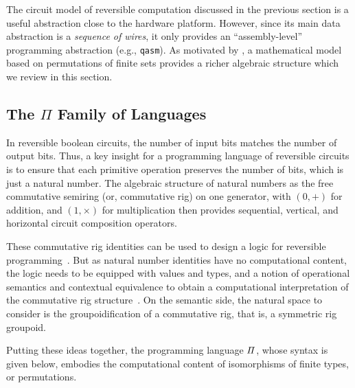 The circuit model of reversible computation discussed in the previous section is a useful abstraction close to the hardware
platform. However, since its main data abstraction is a \emph{sequence of wires}, it only provides an ``assembly-level''
programming abstraction (e.g., \verb|qasm|). As motivated by \citet{LAFONT2003257}, a mathematical model based on
permutations of finite sets provides a richer algebraic structure which we review in this section.

\subsection{The $\Pi$ Family of Languages}
\label{sec:langRev-examples}
\label{examples}

In reversible boolean circuits, the number of input bits matches the number of output bits. Thus, a key insight for a
programming language of reversible circuits is to ensure that each primitive operation preserves the number of bits,
which is just a natural number. The algebraic structure of natural numbers as the free commutative semiring (or,
commutative rig) on one generator, with $(0,+)$ for addition, and $(1,\times)$ for multiplication then provides
sequential, vertical, and horizontal circuit composition operators.

These commutative rig identities can be used to design a logic for reversible
programming~\cite*{sparksSuperstructuralReversibleLogic2014}. But as natural number identities have no computational
content, the logic needs to be equipped with values and types, and a notion of operational semantics and contextual
equivalence to obtain a computational interpretation of the commutative rig
structure~\cite{jamesInformationEffects2012}.  On the semantic side, the natural space to consider is the
groupoidification of a commutative rig, that is, a symmetric rig groupoid.

Putting these ideas together, the programming language $\mathit{\Pi}$, whose syntax is given below, embodies the
computational content of isomorphisms of finite types, or permutations.



